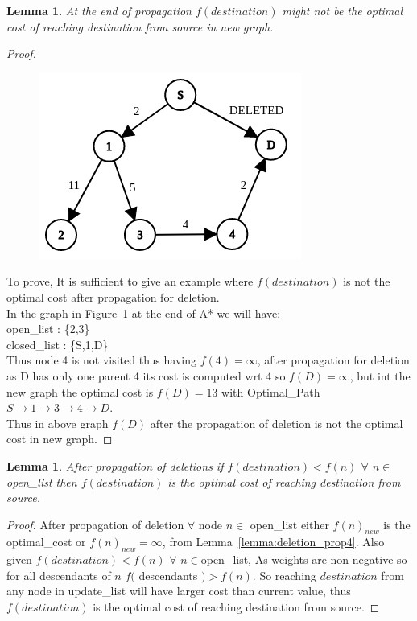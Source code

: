 \documentclass[a4paper]{article}
\newtheorem{lemma}[theorem]{Lemma}
\begin{document}
\begin{lemma}\label{lemma:deletion_prop5}
At the end of propagation $f(destination)$ might not be the optimal cost of reaching destination from source in new graph.
\end{lemma}
\begin{proof}
\begin{figure}[H]
    \centering
    \includegraphics[scale=0.4]{img/del_prop.png}
    \caption{}
    \label{fig:deletion_proof}
\end{figure}
To prove, It is sufficient to give an example where $f(destination)$ is not the optimal cost after propagation for deletion.\\
In the graph in Figure~\ref{fig:deletion_proof} at the end of A* we will have:\\
open\_list : \{2,3\}\\
closed\_list : \{S,1,D\}\\
Thus node 4 is not visited thus having $f(4)=\infty$, after propagation for deletion as D has only one parent 4 its cost is computed wrt 4 so $f(D)=\infty$, but int the new graph the optimal cost is $f(D)=13$ with Optimal\_Path $S\rightarrow 1\rightarrow 3 \rightarrow 4 \rightarrow D$.\\
Thus in above graph $f(D)$ after the propagation of deletion is not the optimal cost in new graph.  
\end{proof}

\begin{lemma}\label{lemma:deletion_prop6}
After propagation of deletions if $f(destination) < f(n)$ $ \forall$ $n \in $open\_list then $f(destination)$ is the optimal cost of reaching destination from source.
\end{lemma}
\begin{proof}
After propagation of deletion $\forall$ node $n \in $ open\_list either $f(n)_{new}$ is the optimal\_cost or $f(n)_{new} = \infty$, from Lemma~\ref{lemma:deletion_prop4}. Also given $f(destination) < f(n)$ $ \forall$ $n \in $open\_list, As weights are non-negative so for all descendants of $n$ $f($ descendants $) > f(n)$. So reaching $destination$ from any node in update\_list will have larger cost than current value, thus $f(destination)$ is the optimal cost of reaching destination from source.
\end{proof}
\end{document}
